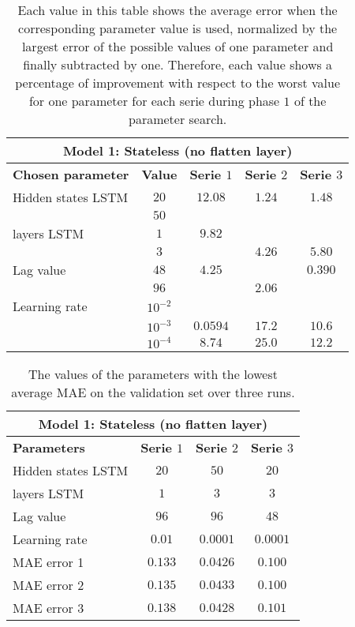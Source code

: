 \begin{table}[ht]
	\centering
	\begin{tabular}{@{}l||c|ccc@{}} \toprule
		\multicolumn{5}{c}{Model 1: Stateless (no flatten layer)}\\\midrule\midrule
		\textbf{Chosen parameter}	& \textbf{Value} & \textbf{Serie $ 1 $} & \textbf{Serie $ 2 $} & \textbf{Serie $ 3 $}\\\midrule
		Hidden states LSTM & $ 20 $ & $12.08 $		&$ 1.24 $  & $1.48 $\\
		 		   & $ 50 $ & 		  		&		   & 		\\\hline
		layers LSTM & $ 1 $ & $9.82 $		&		   & 		\\
				    & $ 3 $ & 	      		&$ 4.26 $  & $5.80$\\\hline
		Lag value & $ 48 $ & $4.25 $ 		&		   & $0.390$\\
				  & $ 96 $ &          		&$ 2.06 $  & 		\\\hline
		Learning rate & $ 10^{-2} $ &       &		   & 		\\
					& $  10^{-3} $ &$0.0594 $&$ 17.2$  & $10.6$\\
					& $  10^{-4} $ &$8.74 $&$ 25.0$    & $12.2$\\\bottomrule
			
	\end{tabular}
	\caption{Each value in this table shows the average error when the corresponding parameter value is used, normalized by the largest error of the possible values of one parameter and finally subtracted by one. Therefore, each value shows a percentage of improvement with respect to the worst value for one parameter for each serie during phase $ 1 $ of the parameter search.}
	\label{tab:relative_performance_parameters_phase_one_model_one}
\end{table}


\begin{table}[ht]
	\centering
	\begin{tabular}{@{}l|ccc@{}} \toprule
		\multicolumn{4}{c}{Model 1: Stateless (no flatten layer)}\\\midrule\midrule
		\textbf{Parameters}	& \textbf{Serie $ 1 $} & \textbf{Serie $ 2 $} & \textbf{Serie $ 3 $}\\\midrule
		Hidden states LSTM & $20 $&$ 50 $  & $20 $\\
		layers LSTM & $1 $&$ 3 $  & $3$\\
		Lag value & $96 $&$ 96$  & $48$\\
		Learning rate & $0.01 $&$ 0.0001$  & $0.0001$\\\hline
		MAE error 1   & $ 0.133 $ & $ 0.0426 $ & $ 0.100 $\\
		MAE error 2   & $ 0.135 $ & $ 0.0433 $ & $ 0.100 $\\
		MAE error 3   & $ 0.138 $ & $ 0.0428 $ & $ 0.101 $\\\bottomrule
	\end{tabular}
	\caption{The values of the parameters with the lowest average MAE on the validation set over three runs.}
	\label{tab:best_performing_para_phase1}
\end{table}
\newpage

